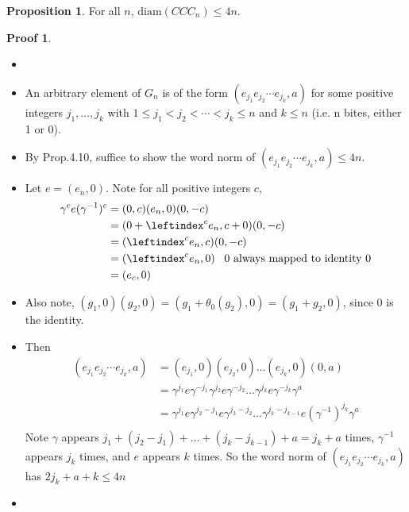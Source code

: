 \documentclass{book}
\newcommand{\diam}[1]{\textrm{diam}( #1 )}
\theoremstyle{definition}
\newtheorem{proposition}[lemma]{Proposition}
\theoremstyle{remarkstyle}
\newtheorem*{myproof}{Proof}%
\begin{document}
\begin{proposition}
    For all $n$, $\diam{CCC_{n}}\le 4n$.
\end{proposition}
\begin{myproof}
    \begin{itemize}
        \item[]
        \item An arbitrary element of $G_{n} $ is of the form $(e_{j_1}e_{j_2}\cdots e_{j_k},a)$ for some positive integers $j_{1},\dots,j_{k} $ with $1\le j_{1} < j_{2} < \cdots < j_{k} \le n $ and $k\le n$ (i.e. n bites, either 1 or 0). 
        \item By Prop.4.10, suffice to show the word norm of $(e_{j_1}e_{j_2}\cdots e_{j_k},a) \le 4n $. 
        \item Let $e=(e_{n},0) $. Note for all positive integers $c$, 
        \begin{align*}
        \gamma^{c}e(\gamma^{-1})^{c} &= (0,c)(e_{n},0)(0,-c) \\
        &= (0+\leftindex^{c} e_{n}, c+0)(0,-c) \\
        &= (\leftindex^{c} e_{n}, c)(0,-c) \\
        &= (\leftindex^{c} e_{n}, 0) \; \; \; \textrm{0 always mapped to identity 0} \\
        &= (e_{c},0)
        \end{align*}
        \item Also note, $(g_{1},0)(g_{2},0) = (g_{1}+\theta_{0}(g_{2}),0) = (g_{1}+g_{2},0)  $, since 0 is the identity.
        \item Then 
        \begin{align*}
        (e_{j_1}e_{j_2}\cdots e_{j_k},a) 
        &= (e_{j_1},0)(e_{j_2},0)\dots(e_{j_k},0)(0,a) \\
        &= \gamma^{j_{1}}e\gamma^{-j_{1}}\gamma^{j_{2}}e\gamma^{-j_{2}}\dots\gamma^{j_{k}}e\gamma^{-j_{k}}\gamma^{a} \\
        &= \gamma^{j_{1}}e\gamma^{j_{2}-j_{1}}e\gamma^{j_{3} -j_{2}}\dots\gamma^{j_{k}-j_{k-1}}e(\gamma^{-1})^{j_{k}}\gamma^{a} \\
        \end{align*}
        Note $\gamma$ appears $j_{1} + (j_{2}-j_{1})+\dots + (j_{k}-j_{k-1})+a = j_{k}+a $ times, $\gamma^{-1}$ appears $j_{k} $ times, and $e$ appears $k$ times. So the word norm of $(e_{j_1}e_{j_2}\cdots e_{j_k},a)$ has $2j_{k} + a + k \le 4n $
        \item[] 
    \end{itemize}
\end{myproof}
\end{document}
